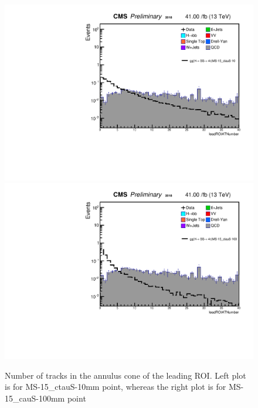  \begin{figure}[h!]
   \caption{Number of tracks in the annulus cone of the leading ROI. Left plot is for MS-15\_ctauS-10mm point, whereas the right plot is for MS-15\_cauS-100mm point}
   \label{fig:ANleadSize}
   \centering
   \includegraphics[width=0.47\linewidth]{figs/AnalysisNoteplot_MS-15_ctauS-10_leadROIATNumber.pdf}
   \includegraphics[width=0.47\linewidth]{figs/AnalysisNoteplot_MS-15_ctauS-100_leadROIATNumber.pdf}
 \end{figure}


